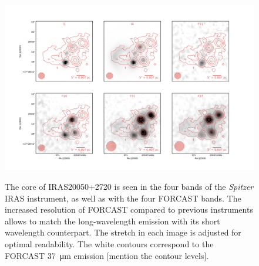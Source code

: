 \begin{landscape}
\begin{figure}
\begin{center}
\includegraphics[width=1.5\textwidth]{Figures/IRAS20050.png}
\label{fig:IRAS20050_mosaic}
\vspace{-1cm}
\caption{The core of IRAS20050+2720 is seen in the four bands of the \textit{Spitzer} IRAS instrument, as well as with the four FORCAST bands. The increased resolution of FORCAST compared to previous instruments allows to match the long-wavelength emission with its short wavelength counterpart. The stretch in each image is adjusted for optimal readability. The white contours correspond to the FORCAST \SI{37}{\micro\meter} emission [mention the contour levels]. }
\end{center}
\end{figure}
\end{landscape}

